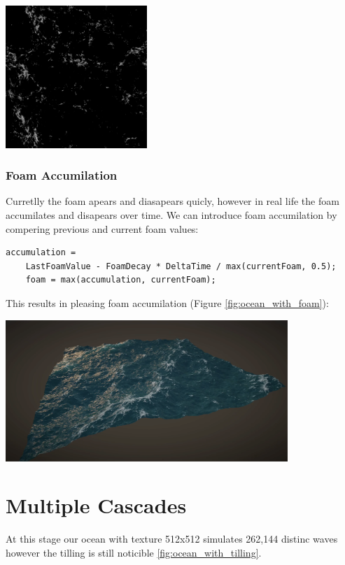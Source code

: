 \begin{minipage}{1\textwidth}
    \centering
    \includegraphics[width=0.40\textwidth]{"images/foam_texture.png"}
    \label{fig:foam_texture}
\end{minipage}

\subsubsection{Foam Accumilation}
Curretlly the foam apears and diasapears quicly, however in real life the foam accumilates and disapears over time.
We can introduce foam accumilation by compering previous and current foam values:
\begin{lstlisting}[caption={Foam Accumilation}, frame=single, numberstyle=\small\color{gray}, captionpos=b]
    accumulation = 
    LastFoamValue - FoamDecay * DeltaTime / max(currentFoam, 0.5);
    foam = max(accumulation, currentFoam);
\end{lstlisting}
This results in pleasing foam accumilation (Figure \ref{fig:ocean_with_foam}):

\begin{minipage}{1\textwidth}
    \centering
    \includegraphics[width=0.8\textwidth]{"images/ocean_with_foam.png"}
    \label{fig:ocean_with_foam}
\end{minipage}

\section{Multiple Cascades}
At this stage our ocean with texture 512x512 simulates 262,144 distinc waves however the tilling is still noticible \ref{fig:ocean_with_tilling}.

